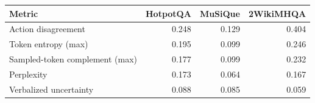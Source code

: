 \begin{tabular}{@{}lrrr@{}}
\toprule
Metric & HotpotQA & MuSiQue & 2WikiMHQA \\
\midrule
Action disagreement & 0.248 & 0.129 & 0.404 \\
Token entropy (max) & 0.195 & 0.099 & 0.246 \\
Sampled-token complement (max) & 0.177 & 0.099 & 0.232 \\
Perplexity & 0.173 & 0.064 & 0.167 \\
Verbalized uncertainty & 0.088 & 0.085 & 0.059 \\
\bottomrule
\end{tabular}
